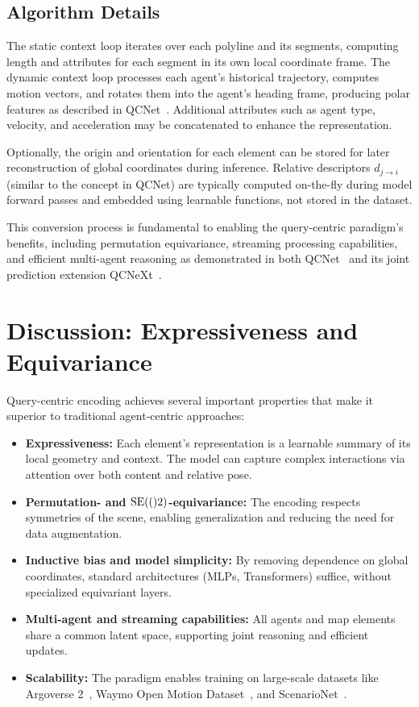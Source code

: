 \subsection*{Algorithm Details}
The static context loop iterates over each polyline and its segments, computing length and attributes for each segment in its own local coordinate frame. The dynamic context loop processes each agent's historical trajectory, computes motion vectors, and rotates them into the agent's heading frame, producing polar features as described in QCNet~\cite{Zhou2023QueryCentric}. Additional attributes such as agent type, velocity, and acceleration may be concatenated to enhance the representation.

Optionally, the origin and orientation for each element can be stored for later reconstruction of global coordinates during inference. Relative descriptors $d_{j \to i}$ (similar to the concept in QCNet) are typically computed on-the-fly during model forward passes and embedded using learnable functions, not stored in the dataset.

This conversion process is fundamental to enabling the query-centric paradigm's benefits, including permutation equivariance, streaming processing capabilities, and efficient multi-agent reasoning as demonstrated in both QCNet~\cite{Zhou2023QueryCentric} and its joint prediction extension QCNeXt~\cite{qcnextZhou2023}.

\section{Discussion: Expressiveness and Equivariance}
Query-centric encoding achieves several important properties that make it superior to traditional agent-centric approaches:

\begin{itemize}
    \item \textbf{Expressiveness:} Each element's representation is a learnable summary of its local geometry and context. The model can capture complex interactions via attention over both content and relative pose.
    \item \textbf{Permutation- and $\mathrm{SE}(()2)$-equivariance:} The encoding respects symmetries of the scene, enabling generalization and reducing the need for data augmentation.
    \item \textbf{Inductive bias and model simplicity:} By removing dependence on global coordinates, standard architectures (MLPs, Transformers) suffice, without specialized equivariant layers.
    \item \textbf{Multi-agent and streaming capabilities:} All agents and map elements share a common latent space, supporting joint reasoning and efficient updates.
    \item \textbf{Scalability:} The paradigm enables training on large-scale datasets like Argoverse 2~\cite{av2Wilson2023}, Waymo Open Motion Dataset~\cite{wmodSun2020}, and ScenarioNet~\cite{scenarionetLi2023}.
\end{itemize}

